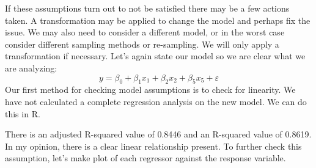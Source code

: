 \documentclass[12pt,letterpaper]{article}
\begin{document}
If these assumptions turn out to not be satisfied there may be a few actions taken. A transformation may be applied to change the model and perhaps fix the issue. We may also need to consider a different model, or in the worst case consider different sampling methods or re-sampling. We will only apply a transformation if necessary. Let's again state our model so we are clear what we are analyzing: $$y=\beta_0+\beta_1x_1+\beta_2x_2+\beta_5x_5+\varepsilon$$ Our first method for checking model assumptions is to check for linearity. We have not calculated a complete regression analysis on the new model. We can do this in R.

\begin{mdframed}

\end{mdframed}

There is an adjusted R-squared value of 0.8446 and an R-squared value of 0.8619. In my opinion, there is a clear linear relationship present. To further check this assumption, let's make plot of each regressor against the response variable.
\end{document}
